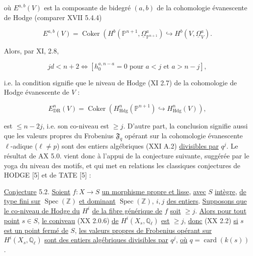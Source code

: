 où $E^{a,b}(V)$ est la composante de bidegré $(a,b)$ de la \og cohomologie
évanescente de Hodge\fg{} (comparer XVII 5.4.4)

\begin{equation}\tag{5.1.3}
E^{a,b}(V)
=\operatorname{Coker}\!\left(
H^b(\mathbb P^{n+1},\underline{\Omega}_{\mathbb P^{n+1}}^a)
\hookrightarrow H^b(V,\underline{\Omega}_V^a)\right..
\end{equation}

Alors, par XI, 2.8,

\begin{equation}\tag{5.1.4}
jd<n+2
\Longleftrightarrow
\left[h_0^{a,n-a}=0\text{ pour }a<j\text{ et }a>n-j\right],
\end{equation}

i.e. la condition signifie que le \og niveau de Hodge\fg{} (XI 2.7) de la
\og cohomologie de Hodge évanescente\fg{} de $V$ :

\begin{equation*}
E_{\mathrm{DR}}^n(V)
=\operatorname{Coker}\!\left(
H_{\mathrm{Hdg}}^n(\mathbb P^{n+1})
\hookrightarrow H_{\mathrm{Hdg}}^n(V)\right),
\end{equation*}


est $\leq n-2j$, i.e. son co-niveau est $\geq j$. D'autre part, la
conclusion signifie aussi que les valeurs propres du Frobenius
$\mathfrak F_q$ opérant sur la cohomologie évanescente $\ell$-adique
($\ell\ne p$) sont des entiers algébriques (XXI A.2) \underline{divisibles par} $q^j$.
Le résultat de AX 5.0. vient donc à l'appui de la conjecture suivante,
suggérée par le yoga du niveau des motifs, et qui met en relations les
classiques conjectures de HODGE [5] et de TATE [5] :

\underline{Conjecture} 5.2.
\underline{Soient} $f:X\to S$ \underline{un morphisme propre et lisse}, \underline{avec} $S$ \underline{intègre}, \underline{de type
fini sur} $\operatorname{Spec}(\mathbb Z)$ \underline{et dominant}
$\operatorname{Spec}(\mathbb Z)$, $i,j$ \underline{des entiers}. \underline{Supposons que le
co-niveau de Hodge du} $H^i$ \underline{de la fibre générique de} $f$ \underline{soit} $\geq j$.
\underline{Alors pour tout point} $s\in S$, \underline{le coniveau} (XX 2.0.6) \underline{de}
$H^i(X_s,\mathbb Q_\ell)$ \underline{est} $\geq j$, \underline{donc} (XX 2.2) \underline{si} $s$ \underline{est un point
fermé de} $S$, \underline{les valeurs propres de Frobenius opérant sur}
$H^i(X_s,\mathbb Q_\ell)$ \underline{sont des entiers algébriques divisibles par}
$q^j$, \underline{où} $q=\operatorname{card}(k(s))$.

